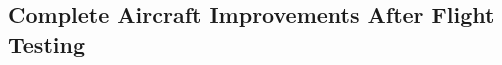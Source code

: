 \documentclass[report]{byu-aero}
\begin{document}
\subsection{Complete Aircraft Improvements After Flight Testing}



{}

\end{document}
